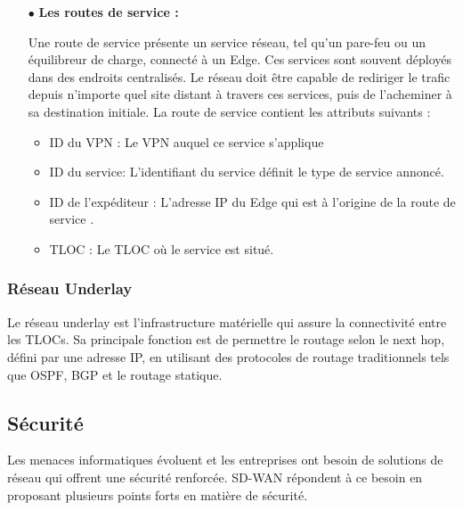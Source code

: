	\begin{itemize}
		\item[$\bullet$]\textbf{ Les routes de service : } 
		
		Une route de service présente un service réseau, tel qu'un pare-feu ou un équilibreur de charge, connecté à un Edge. Ces services sont souvent déployés dans des endroits centralisés. Le réseau doit être capable de rediriger le trafic depuis n'importe quel site distant à travers ces services, puis de l’acheminer à sa destination initiale.
		La route de service contient les attributs suivants :
		\begin{itemize}
			\item{ ID du VPN  : Le VPN auquel ce service s'applique} 
		\end{itemize}
		\begin{itemize}
			\item{  ID du service: L'identifiant du service définit le type de service annoncé.} 
		\end{itemize}
		\begin{itemize}
			\item{	ID de l'expéditeur : L'adresse IP du Edge qui est à l'origine de la route de service .} 
		\end{itemize}
		\begin{itemize}
			\item{		TLOC : Le TLOC où le service est situé. } 
		\end{itemize}
		
		
	\end{itemize}
	\subsubsection{Réseau Underlay }
	
	Le réseau underlay est l'infrastructure matérielle qui assure la connectivité entre les TLOCs. Sa principale fonction est de permettre le routage selon le next hop, défini par une adresse IP, en utilisant des protocoles de routage traditionnels tels que OSPF, BGP et le routage statique.
	
\subsection{Sécurité}

Les menaces informatiques évoluent et les entreprises ont besoin de solutions de réseau qui offrent une sécurité renforcée. SD-WAN répondent à ce besoin en proposant plusieurs points forts en matière de sécurité.

